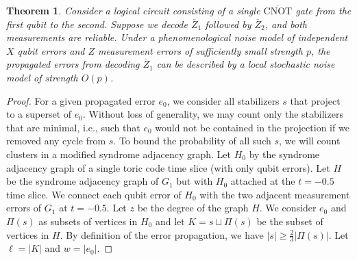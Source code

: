 \documentclass[prx,twocolumn,secnumarabic,balancelastpage,amsmath,amssymb,longbibliography]{revtex4-2}
\newtheorem{theorem}[thm]{Theorem}
\newcommand{\lop}[1]{\overline{#1}}
\newcommand{\lcnot}{\overline{\text{CNOT}}}
\begin{document}
\begin{theorem}\label{thm:local_stochastic}
Consider a logical circuit consisting of a single $\lcnot$ gate from the first qubit to the second. 
%
Suppose we decode $\lop Z_1$ followed by $\lop Z_2$, and both measurements are reliable. 
%
Under a phenomenological noise model of independent $X$ qubit errors and $Z$ measurement errors of sufficiently small strength $p$, the propagated errors from decoding $\lop Z_1$ can be described by a local stochastic noise model of strength $O(p)$.
\end{theorem}

\begin{proof}
For a given propagated error $e_0$, we consider all stabilizers $s$ that project to a superset of $e_0$. Without loss of generality, we may count only the stabilizers that are minimal, i.e., such that $e_0$ would not be contained in the projection if we removed any cycle from $s$.
%
To bound the probability of all such $s$, we will count clusters in a modified syndrome adjacency graph. Let $H_0$ by the syndrome adjacency graph of a single toric code time slice (with only qubit errors). 
%
Let $H$ be the syndrome adjacency graph of $G_1$ but with $H_0$ attached at the $t=-0.5$ time slice. 
%
We connect each qubit error of $H_0$ with the two adjacent measurement errors of $G_1$ at $t=-0.5$. Let $z$ be the degree of the graph $H$.
%
We consider $e_0$ and $\Pi(s)$ as subsets of vertices in $H_0$ and let $K = s \sqcup \Pi(s)$ be the subset of vertices in $H$. 
%
By definition of the error propagation, we have $|s| \ge \frac 2 3 |\Pi(s)|$. Let $\ell = |K|$ and $w = |e_0|$.


\end{proof}
\end{document}
